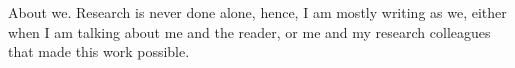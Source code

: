 %
\label{sec:acknowledgement}

About we. Research is never done alone, hence, I am mostly writing as we, either when I am talking about me and the reader, or me and my research colleagues that made this work possible.
